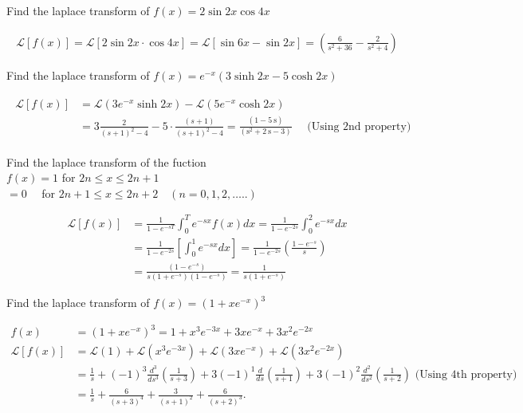 \begin{exercise}
	Find the laplace transform of $f(x)=2 \sin 2 x \cos 4 x$
\end{exercise}
\begin{answer}
	\begin{align*}
	\mathcal{L}[f(x)]=\mathcal{L}[2 \sin 2 x \cdot \cos 4 x]=\mathcal{L}[\sin 6 x-\sin 2 x]=\left(\frac{6}{s^{2}+36}-\frac{2}{s^{2}+4}\right)
	\end{align*}
\end{answer}
\begin{exercise}
	Find the laplace transform of $f(x)=e^{-x}(3 \sinh 2 x-5 \cosh 2 x)$
\end{exercise}
\begin{answer}
	\begin{align*}
	\begin{aligned}
	\mathcal{L}[f(x)] &=\mathcal{L}\left(3 e^{-x} \sinh 2 x\right)-\mathcal{L}\left(5 e^{-x} \cosh 2 x\right) \\
	&=3 \frac{2}{(s+1)^{2}-4}-5 \cdot \frac{(s+1)}{(s+1)^{2}-4}=\frac{(1-5 \mathrm{~s})}{\left(\mathrm{s}^{2}+2 \mathrm{~s}-3\right)} \quad \text { (Using 2nd property) }
	\end{aligned}
	\end{align*}
\end{answer}
\begin{exercise}
	Find the laplace transform of the fuction\\
	$f(x)=1$ for $2 n \leq x \leq 2 n+1$\\
	$=0 \quad$ for $2 n+1 \leq x \leq 2 n+2 \quad(n=0,1,2, \ldots . .)$
\end{exercise}
\begin{answer}
	\begin{align*}
	\mathcal{L}[f(x)] &=\frac{1}{1-e^{-s T}} \int_{0}^{T} e^{-s x} f(x) d x=\frac{1}{1-e^{-2 s}} \int_{0}^{2} e^{-s x} d x \\
	&=\frac{1}{1-e^{-2 s}}\left[\int_{0}^{1} e^{-s x} d x\right]=\frac{1}{1-e^{-2 s}}\left(\frac{1-e^{-s}}{s}\right)\\
	&=\frac{\left(1-e^{-s}\right)}{s\left(1+e^{-s}\right)\left(1-e^{-s}\right)}=\frac{1}{s\left(1+e^{-s}\right)}
	\end{align*}
\end{answer}
\begin{exercise}
	Find the laplace transform of $f(x)=\left(1+x e^{-x}\right)^{3}$
\end{exercise}
\begin{answer}
	\begin{align*}
	f(x)&=\left(1+x e^{-x}\right)^{3}=1+x^{3} e^{-3 x}+3 x e^{-x}+3 x^{2} e^{-2 x} \\
\mathcal{L}[f(x)]&=\mathcal{L}(1)+\mathcal{L}\left(x^{3} e^{-3 x}\right)+\mathcal{L}\left(3 x e^{-x}\right)+\mathcal{L}\left(3 x^{2} e^{-2 x}\right)\\
	&=\frac{1}{s}+(-1)^{3} \frac{d^{3}}{d s^{3}}\left(\frac{1}{s+3}\right)+3(-1)^{1} \frac{d}{d s}\left(\frac{1}{s+1}\right)+3(-1)^{2} \frac{d^{2}}{d s^{2}}\left(\frac{1}{s+2}\right)\text{ (Using 4th property)}\\
	&=\frac{1}{s}+\frac{6}{(s+3)^{4}}+\frac{3}{(s+1)^{2}}+\frac{6}{(s+2)^{3}} \text {. }
	\end{align*}
\end{answer}

